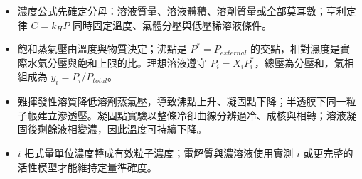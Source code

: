 \documentclass[11pt,a4paper]{article}
\providecommand{\tightlist}{%
  \setlength{\itemsep}{0pt}\setlength{\parskip}{0pt}}
\begin{document}
\begin{itemize}
\tightlist
\item
  濃度公式先確定分母：溶液質量、溶液體積、溶劑質量或全部莫耳數；亨利定律 \(C=k_HP\) 同時固定溫度、氣體分壓與低壓稀溶液條件。
\item
  飽和蒸氣壓由溫度與物質決定；沸點是 \(P^*=P_{external}\) 的交點，相對濕度是實際水氣分壓與飽和上限的比。理想溶液遵守 \(P_i=X_iP_i^*\)，總壓為分壓和，氣相組成為 \(y_i=P_i/P_{total}\)。
\item
  難揮發性溶質降低溶劑蒸氣壓，導致沸點上升、凝固點下降；半透膜下同一粒子帳建立滲透壓。凝固點實驗以整條冷卻曲線分辨過冷、成核與相轉；溶液凝固後剩餘液相變濃，因此溫度可持續下降。
\item
  \(i\) 把式量單位濃度轉成有效粒子濃度；電解質與濃溶液使用實測 \(i\) 或更完整的活性模型才能維持定量準確度。
\end{itemize}
\end{document}
